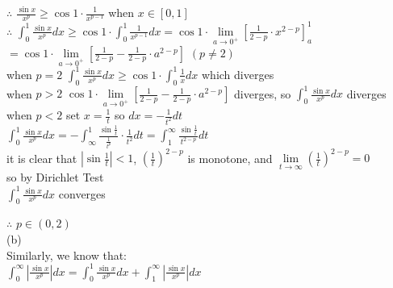 \documentclass{article}
\begin{document}
$\therefore$ \qquad $\displaystyle \frac{\sin{x}}{x^p} \geq \cos{1} \cdot \frac{1}{x^{p-1}}$ when $x \in [0,1]$\\

$\therefore$ \qquad $\displaystyle \int_0^1 \frac{\sin{x}}{x^p}dx \geq \cos{1} \cdot \int_0^1 \frac{1}{x^{p-1}}dx = \cos{1} \cdot \lim \limits_{a \to 0^+} \left[\frac{1}{2-p} \cdot x^{2-p}\right]_a^1$\\

\hskip 2.87cm $\displaystyle = \cos{1} \cdot \lim \limits_{a \to 0^+} \left[\frac{1}{2-p} - \frac{1}{2-p} \cdot a^{2-p}\right]$  $(p \neq 2)$\\

when $p=2$ \quad $\displaystyle \int_0^1 \frac{\sin{x}}{x^p}dx \geq \cos{1} \cdot \int_0^1 \frac{1}{x}dx$ which diverges\\

when $p>2$ \quad $\displaystyle \cos{1} \cdot \lim \limits_{a \to 0^+} \left[\frac{1}{2-p} - \frac{1}{2-p} \cdot a^{2-p}\right]$ diverges, so $\displaystyle \int_0^1 \frac{\sin{x}}{x^p}dx$ diverges\\

when $p<2$ \quad set $x=\frac{1}{t}$ \quad so $dx = -\frac{1}{t^2}dt$\\

\hskip 2.25cm $\displaystyle \int_0^1 \frac{\sin{x}}{x^p}dx = -\int_\infty^1\frac{\sin{\frac{1}{t}}}{\frac{1}{t^p}} \cdot \frac{1}{t^2}dt = \int_1^\infty \frac{\sin{\frac{1}{t}}}{t^{2-p}}dt$\\

\hskip 2.25cm it is clear that $|\sin{\frac{1}{t}}| < 1$, $(\frac{1}{t})^{2-p}$ is monotone, and $\lim \limits_{t \to \infty} (\frac{1}{t})^{2-p} = 0$\\

\hskip 2.25cm so by Dirichlet Test\\

\hskip 2.25cm $\displaystyle \int_0^1 \frac{\sin{x}}{x^p}dx$ converges\\

\vskip 1cm

$\therefore$ \qquad $p \in (0,2)$\\

(b)\\

Similarly, we know that:\\

$\displaystyle \int_0^\infty \left|\frac{\sin{x}}{x^p}\right|dx = \int_0^1 \frac{\sin{x}}{x^p}dx + \int_1^\infty \left|\frac{\sin{x}}{x^p}\right|dx$\\
\end{document}
